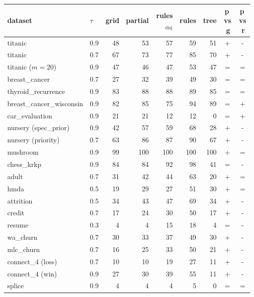 \begin{tabular}{llrrrrrcc}
\toprule
dataset & $\tau$ & grid & partial & rules$_{\mathrm{disj}}$ & rules & tree & p$\,$vs$\,$g & p$\,$vs$\,$r\\
\midrule
titanic & 0.9 & 48 & 53 & 57 & 59 & 51 & + & -\\
titanic & 0.7 & 67 & 73 & 77 & 85 & 70 & + & -\\
titanic ($m{=}20$) & 0.9 & 47 & 46 & 47 & 53 & 47 & = & =\\
breast\_cancer & 0.7 & 27 & 32 & 39 & 49 & 30 & = & =\\
thyroid\_recurrence & 0.9 & 83 & 88 & 88 & 89 & 85 & = & =\\
breast\_cancer\_wisconsin & 0.9 & 82 & 85 & 75 & 94 & 89 & = & +\\
car\_evaluation & 0.9 & 21 & 21 & 12 & 12 & 0 & = & +\\
nursery (spec\_prior) & 0.9 & 42 & 57 & 59 & 68 & 28 & + & -\\
nursery (priority) & 0.7 & 63 & 86 & 87 & 90 & 67 & + & -\\
mushroom & 0.9 & 99 & 100 & 100 & 100 & 100 & + & =\\
chess\_krkp & 0.9 & 84 & 84 & 92 & 98 & 41 & = & -\\
adult & 0.7 & 31 & 42 & 44 & 63 & 20 & + & =\\
hmda & 0.5 & 19 & 29 & 27 & 51 & 30 & + & =\\
attrition & 0.5 & 34 & 43 & 47 & 69 & 34 & + & -\\
credit & 0.7 & 17 & 24 & 30 & 50 & 17 & + & -\\
resume & 0.3 & 4 & 4 & 15 & 18 & 4 & = & -\\
wa\_churn & 0.7 & 30 & 33 & 37 & 49 & 30 & + & -\\
mlc\_churn & 0.7 & 16 & 25 & 33 & 50 & 21 & + & -\\
connect\_4 (loss) & 0.7 & 10 & 10 & 19 & 27 & 11 & + & -\\
connect\_4 (win) & 0.9 & 27 & 30 & 39 & 55 & 11 & + & -\\
splice & 0.9 & 4 & 4 & 4 & 5 & 0 & = & =\\
\bottomrule
\end{tabular}
